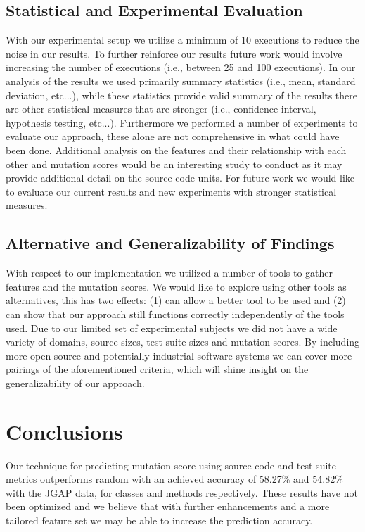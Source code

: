 \subsection{Statistical and Experimental Evaluation}
\label{subsec:conclusions_experimental_evaluation}
With our experimental setup we utilize a minimum of 10 executions to reduce the noise in our results. To further reinforce our results future work would involve increasing the number of executions (i.e., between 25 and 100 executions). In our analysis of the results we used primarily summary statistics (i.e., mean, standard deviation, etc...), while these statistics provide valid summary of the results there are other statistical measures that are stronger (i.e., confidence interval, hypothesis testing, etc...). Furthermore we performed a number of experiments to evaluate our approach, these alone are not comprehensive in what could have been done. Additional analysis on the features and their relationship with each other and mutation scores would be an interesting study to conduct as it may provide additional detail on the source code units. For future work we would like to evaluate our current results and new experiments with stronger statistical measures.


\subsection{Alternative and Generalizability of Findings}
\label{subsec:conclusions_generalizability_findings}
With respect to our implementation we utilized a number of tools to gather features and the mutation scores. We would like to explore using other tools as alternatives, this has two effects: (1) can allow a better tool to be used and (2) can show that our approach still functions correctly independently of the tools used. Due to our limited set of experimental subjects we did not have a wide variety of domains, source sizes, test suite sizes and mutation scores. By including more open-source and potentially industrial software systems we can cover more pairings of the aforementioned criteria, which will shine insight on the generalizability of our approach. 


\section{Conclusions}
\label{sec:conclusions_conclusions}
Our technique for predicting mutation score using source code and test suite metrics outperforms random with an achieved accuracy of 58.27\% and 54.82\% with the JGAP data, for classes and methods respectively. These results have not been optimized and we believe that with further enhancements and a more tailored feature set we may be able to increase the prediction accuracy.

